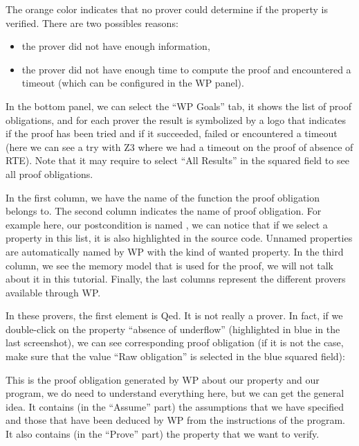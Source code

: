 The orange color indicates that no prover could determine if the
property is verified. There are two possibles reasons:



\begin{itemize}
\item the prover did not have enough information,
\item the prover did not have enough time to compute the proof and
  encountered a timeout (which can be configured in the WP panel).
\end{itemize}


In the bottom panel, we can select the ``WP Goals'' tab, it shows the
list of proof obligations, and for each prover the result is symbolized
by a logo that indicates if the proof has been tried and if it
succeeded, failed or encountered a timeout (here we can see a try with
Z3 where we had a timeout on the proof of absence of RTE). Note that it
may require to select ``All Results'' in the squared field to see all
proof obligations.




In the first column, we have the name of the function the proof
obligation belongs to. The second column indicates the name of proof
obligation. For example here, our postcondition is named
, we can notice
that if we select a property in this list, it is also highlighted in the
source code. Unnamed properties are automatically named by WP with the
kind of wanted property. In the third column, we see the memory model
that is used for the proof, we will not talk about it in this tutorial.
Finally, the last columns represent the different provers available
through WP.



In these provers, the first element is Qed. It is not really a prover.
In fact, if we double-click on the property ``absence of underflow''
(highlighted in blue in the last screenshot), we can see corresponding
proof obligation (if it is not the case, make sure that the value ``Raw
obligation'' is selected in the blue squared field):





This is the proof obligation generated by WP about our property and our
program, we do need to understand everything here, but we can get the
general idea. It contains (in the ``Assume'' part) the assumptions that
we have specified and those that have been deduced by WP from the
instructions of the program. It also contains (in the ``Prove'' part)
the property that we want to verify.




